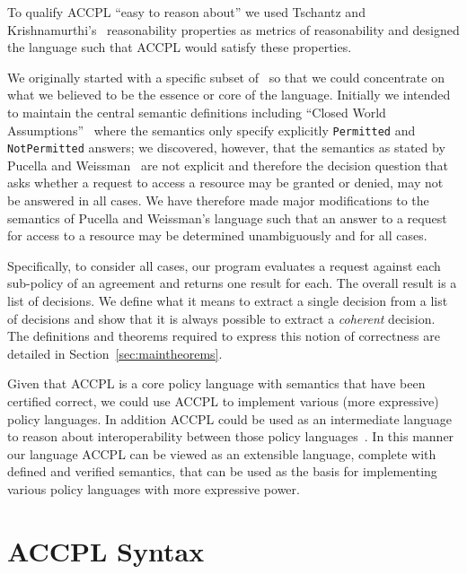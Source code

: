 \documentclass[conference]{IEEEtran}
\newcommand{\syn}{\texttt}
\begin{document}
To qualify \ac{ACCPL} ``easy to reason about'' we used Tschantz and Krishnamurthi's~\cite{Tschantz} reasonability properties as metrics of reasonability and designed the language such that \ac{ACCPL} would satisfy these properties.

We originally started with a specific subset of~\cite{pucella2006} so that we could concentrate on what we believed to be the essence or core of the language. Initially we intended to maintain the central semantic definitions including ``Closed World Assumptions''~\cite{pucella2006} where the semantics only specify explicitly \syn{Permitted} and \syn{NotPermitted} answers; we discovered, however, that the semantics as stated by Pucella and Weissman~\cite{pucella2006} are not explicit and therefore the decision question that asks whether a request to access a resource may be granted or denied, may not be answered in all cases. We have therefore made major modifications to the semantics of Pucella and Weissman's language such that an answer to a request for access to a resource may be determined unambiguously and for all cases.
 
%
Specifically, to consider all cases, our program evaluates a request
against each sub-policy of an agreement and returns one result for
each. The overall result is a list of decisions. We define what it
means to extract a single decision from a list of decisions and show
that it is always possible to extract a \emph{coherent} decision. The
definitions and theorems required to express this notion of
correctness are detailed in Section~\ref{sec:maintheorems}.


Given that \ac{ACCPL} is a core policy language with semantics that have been certified correct, we could use \ac{ACCPL} to implement various (more expressive) policy languages. In addition \ac{ACCPL} could be used as an intermediate language to reason about interoperability between those policy languages~\cite{prados2005interoperability,maronas2009architecture}. In this manner our language \ac{ACCPL} can be viewed as an extensible language, complete with defined and verified semantics, that can be used as the basis for implementing various policy languages with more expressive power. 




 
\section{ACCPL Syntax}
\end{document}
